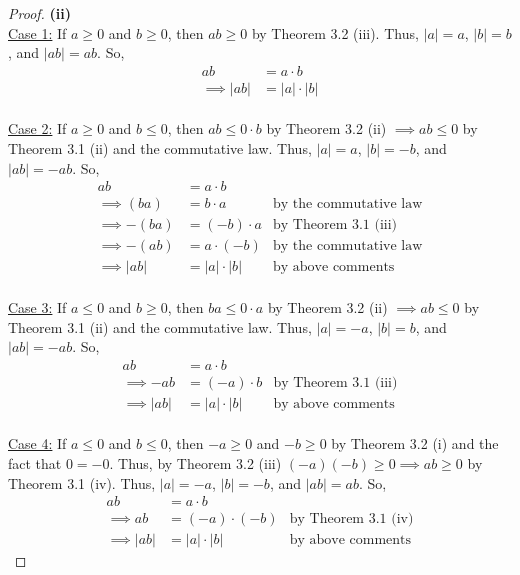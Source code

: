 \documentclass[10pt,a4paper]{article}
\theoremstyle{definition}
\begin{document}
\begin{proof}{\textbf{(ii)}}
\\\underline{Case 1:} If $a \geq 0$ and $b \geq 0$, then $ab \geq 0$ by Theorem 3.2 (iii). Thus, $|a| = a$, $|b| = b$, and $|ab| = ab$. So,
\begin{align*}
ab &= a \cdot b\\
\implies |ab| &= |a| \cdot |b|
\end{align*}
\\\underline{Case 2:} If $a \geq 0$ and $b \leq 0$, then $ab \leq 0 \cdot b$ by Theorem 3.2 (ii) $\implies ab \leq 0$ by Theorem 3.1 (ii) and the commutative law. Thus, $|a| = a$, $|b| = -b$, and $|ab| = -ab$. So,
\begin{align*}
ab &= a \cdot b\\
\implies (ba) &= b \cdot a &\text{by the commutative law}\\
\implies -(ba) &= (-b) \cdot a &\text{by Theorem 3.1 (iii)}\\
\implies -(ab) &= a \cdot (-b) &\text{by the commutative law}\\
\implies |ab| &= |a| \cdot |b| &\text{by above comments}
\end{align*}
\\\underline{Case 3:} If $a \leq 0$ and $b \geq 0$, then $ba \leq 0 \cdot a$ by Theorem 3.2 (ii) $\implies ab \leq 0$ by Theorem 3.1 (ii) and the commutative law. Thus, $|a| = -a$, $|b| = b$, and $|ab| = -ab$. So, 
\begin{align*}
ab &= a \cdot b\\
\implies -ab &= (-a) \cdot b &\text{by Theorem 3.1 (iii)}\\
\implies |ab| &= |a| \cdot |b| &\text{by above comments}
\end{align*}
\\\underline{Case 4:} If $a \leq 0$ and $b \leq 0$, then $-a \geq 0$ and $-b \geq 0$ by Theorem 3.2 (i) and the fact that $0 = -0$. Thus, by Theorem 3.2 (iii) $(-a)(-b) \geq 0 \implies ab \geq 0$ by Theorem 3.1 (iv). Thus, $|a| = -a$, $|b| = -b$, and $|ab| = ab$. So,
\begin{align*}
ab &= a \cdot b\\
\implies ab &= (-a) \cdot (-b) &\text{by Theorem 3.1 (iv)}\\
\implies |ab| &= |a| \cdot |b| &\text{by above comments}
\end{align*}
\end{proof}
\end{document}

